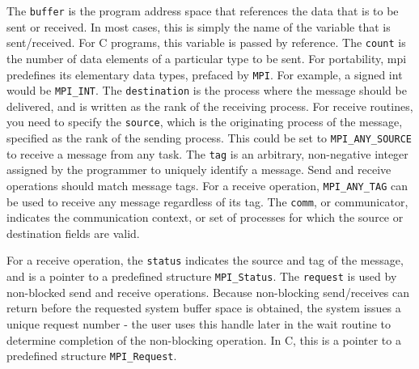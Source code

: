\documentclass[10pt]{article}
\begin{document}
\begin{flushleft}
The {\tt buffer} is the program address space that references the data that is to be sent or received. In most cases, this is simply the name of the variable that is sent/received. For C programs, this variable is passed by reference. The {\tt count} is the number of data elements of a particular type to be sent. For portability, \gls{mpi} predefines its elementary data types, prefaced by {\tt MPI}. For example, a signed int would be {\tt MPI\_INT}. The {\tt destination} is the process where the message should be delivered, and is written as the rank of the receiving process. For receive routines, you need to specify the {\tt source}, which is the originating process of the message, specified as the rank of the sending process. This could be set to {\tt MPI\_ANY\_SOURCE} to receive a message from any task. The {\tt tag} is an arbitrary, non-negative integer assigned by the programmer to uniquely identify a message. Send and receive operations should match message tags. For a receive operation, {\tt MPI\_ANY\_TAG} can be used to receive any message regardless of its tag. The {\tt comm}, or communicator, indicates the communication context, or set of processes for which the source or destination fields are valid. 

For a receive operation, the {\tt status} indicates the source and tag of the message, and is a pointer to a predefined structure {\tt MPI\_Status}. The {\tt request} is used by non-blocked send and receive operations. Because non-blocking send/receives can return before the requested system buffer space is obtained, the system issues a unique request number - the user uses this handle later in the wait routine to determine completion of the non-blocking operation. In C, this is a pointer to a predefined structure {\tt MPI\_Request}. 


\end{flushleft}
\end{document}

